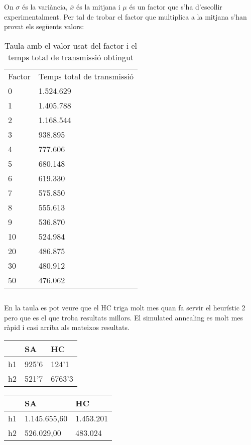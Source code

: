 \documentclass[a4paper, 12pt]{article}
\begin{document}
On $\sigma$ és la variància, $\overline{x}$ és la mitjana i $\mu$ és un factor que s'ha d'escollir experimentalment.
Per tal de trobar el factor que multiplica a la mitjana s'han provat els següents valors:

\begin{table}[h]
\centering
\footnotesize
\begin{tabular}{l | l}
	Factor & Temps total de transmissió \\
0&	1.524.629 \\
1&	1.405.788 \\
2&	1.168.544 \\
3&	938.895 \\
4&	777.606 \\
5&	680.148 \\
6&	619.330 \\
7&	575.850 \\
8&	555.613 \\
9&	536.870 \\
10&	524.984 \\
20&	486.875 \\
30&	480.912 \\
50&	476.062 \\
\end{tabular}
\caption{Taula amb el valor usat del factor i el temps total de transmissió obtingut}
\end{table}

\newpage
\subsection{}

En la taula es pot veure que el HC triga molt mes quan fa servir el heurístic 2 pero que es el que troba resultats millors. El simulated annealing es molt mes ràpid i casi arriba als mateixos resultats.
\begin{table}[h]
\begin{minipage}[b]{0.49\linewidth}
	\centering
\begin{tabular}{l|l|l}
&	SA&	HC \\
\hline
	h1&	925'6&	124'1\\
	h2&	521'7&	6763'3\\
\end{tabular}
\end{minipage}
\hfill
\begin{minipage}[b]{0.49\linewidth}
	\centering
\begin{tabular}{l|l|l}
	& SA &	HC \\
	\hline
	h1	& 1.145.655,60&	1.453.201 \\
	h2	& 526.029,00&	483.024  \\
\end{tabular}
\end{minipage}
\end{table}
\end{document}
